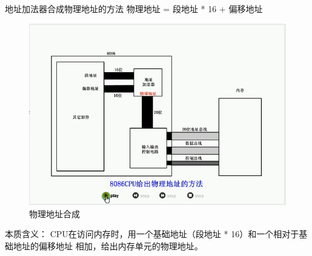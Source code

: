 \documentclass[12pt]{ctexart}
\begin{document}
地址加法器合成物理地址的方法
物理地址 = 段地址 * 16 + 偏移地址
\begin{figure}[htbp]
    \centering
    \includegraphics[scale=0.6]{物理地址.png}
    \caption{物理地址合成}
    \end{figure} 
本质含义：
CPU在访问内存时，用一个基础地址（段地址 * 16）和一个相对于基础地址的偏移地址
相加，给出内存单元的物理地址。
\end{document}
